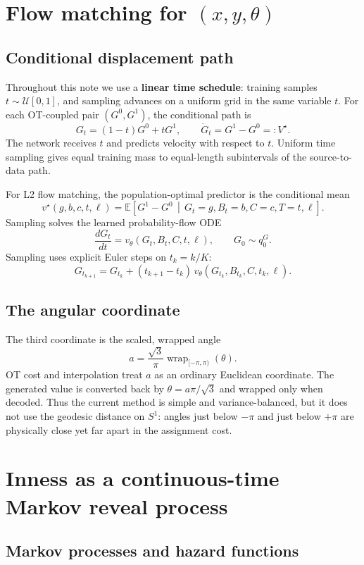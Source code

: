 \documentclass[11pt]{article}
\newcommand{\E}{\mathbb{E}}
\newcommand{\1}{\mathbf{1}}
\newcommand{\given}{\,\middle|\,}
\newcommand{\term}[1]{\textcolor{AimBlue}{\textbf{#1}}}
\begin{document}
\section{Flow matching for \texorpdfstring{\((x,y,\theta)\)}{(x,y,theta)}}

\subsection{Conditional displacement path}

Throughout this note we use a \term{linear time schedule}: training samples
\(t\sim\mathcal U[0,1]\), and sampling advances on a uniform grid in the same
variable \(t\).  For each OT-coupled pair \((G^0,G^1)\), the conditional path is
\[
  G_t=(1-t)G^0+tG^1,
  \qquad
  \dot G_t=G^1-G^0=:V^\star.
\]
The network receives \(t\) and predicts velocity with respect to \(t\).
Uniform time sampling gives equal training mass to equal-length subintervals
of the source-to-data path.

For L2 flow matching, the population-optimal predictor is the conditional
mean
\[
 v^\star(g,b,c,t,\ell)
 =\E\!\left[G^1-G^0\given G_t=g,B_t=b,C=c,T=t,\ell\right].
\]
Sampling solves the learned probability-flow ODE
\[
  \frac{dG_t}{dt}=v_\theta(G_t,B_t,C,t,\ell),\qquad G_0\sim q_0^G.
\]
Sampling uses explicit Euler steps on \(t_k=k/K\):
\[
  G_{t_{k+1}}=G_{t_k}
  +(t_{k+1}-t_k)\,v_\theta(G_{t_k},B_{t_k},C,t_k,\ell).
\]

\subsection{The angular coordinate}

The third coordinate is the scaled, wrapped angle
\[
  a=\frac{\sqrt3}{\pi}\operatorname{wrap}_{[-\pi,\pi)}(\theta).
\]
OT cost and interpolation treat \(a\) as an ordinary Euclidean coordinate.
The generated value is converted back by
\(\theta=a\pi/\sqrt3\) and wrapped only when decoded.
Thus the current method is simple and variance-balanced, but it does not use
the geodesic distance on \(S^1\): angles just below \(-\pi\) and just below
\(+\pi\) are physically close yet far apart in the assignment cost.

\section{Inness as a continuous-time Markov reveal process}

\subsection{Markov processes and hazard functions}
\end{document}
